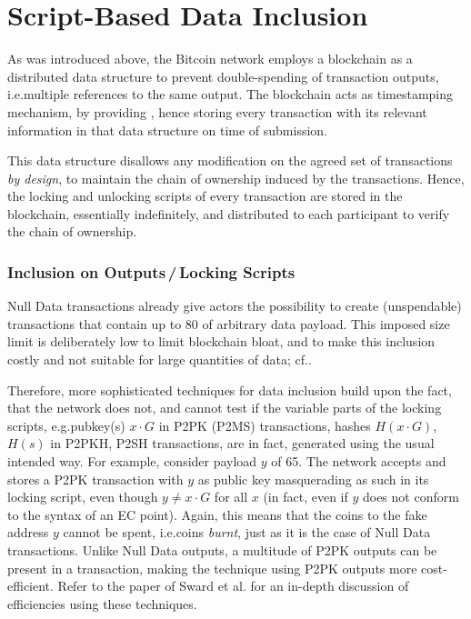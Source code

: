 \documentclass[a4paper,11pt,titlepage]{scrbook}
\begin{document}
\section{Script-Based Data Inclusion}\label{sec:fakekeys}

As was introduced above, the Bitcoin network employs a blockchain as a distributed data structure to prevent double-spending of transaction outputs, i.e.\@ multiple references to the same output.
The blockchain acts as timestamping mechanism, by providing , hence storing every transaction with its relevant information in that data structure on time of submission.

This data structure disallows any modification on the agreed set of transactions \emph{by design}, to maintain the chain of ownership induced by the transactions.
Hence, the locking and unlocking scripts of every transaction are stored in the blockchain, essentially indefinitely, and distributed to each participant to verify the chain of ownership.

\subsubsection*{Inclusion on Outputs\,/\,Locking Scripts}

Null Data transactions already give actors the possibility to create (unspendable) transactions that contain up to \SI{80}{\byte} of arbitrary data payload. This imposed size limit is deliberately low to limit blockchain bloat, and to make this inclusion costly and not suitable for large quantities of data; cf.\@ \cite[155--156]{antonopoulos_mastering_2017}.

Therefore, more sophisticated techniques for data inclusion build upon the fact, that the network does not, and cannot test if the variable parts of the locking scripts, e.g.\@ pubkey(s) $x\cdot G$ in P2PK (P2MS) transactions, hashes $H(x\cdot G)$, $H(s)$ in P2PKH, P2SH transactions, are in fact, generated using the usual intended way.
For example, consider payload $y$ of \SI{65}{\byte}.
The network accepts and stores a P2PK transaction with $y$ as  public key masquerading as such in its locking script, even though $y\neq x\cdot G$ for all $x$ (in fact, even if $y$ does not conform to the syntax of an EC point).
Again, this means that the coins  to the fake address $y$ cannot be spent, i.e.\@ coins \emph{burnt}, just as it is the case of Null Data transactions.
Unlike Null Data outputs, a multitude of P2PK outputs can be present in a transaction, making the technique using P2PK outputs more cost-efficient.
Refer to the paper of Sward et al.\@ \cite{sward_data_2018} for an in-depth discussion of efficiencies using these techniques.
\end{document}
